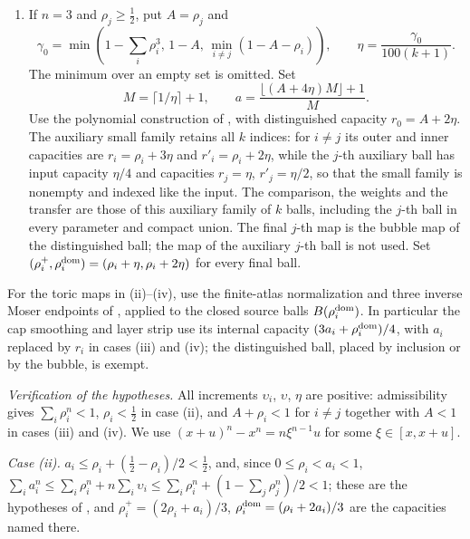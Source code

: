 \begin{construction}
\begin{enumerate}[label=(\roman*)]
\[ \]
 Use the construction of . For the distinguished ball set
 $(\rho_j^+,\rho_j^{\rm dom})=(A+\upsilon/2,A+\upsilon)$; its map is the inclusion, defined and injective on all of $\C^n$, and
 Theorem~\ref{thm:mdl-lrg} places $B((A+a)/2)=B(\rho_j^+)$ in $\Bo(a)$. For $i\ne j$, set
 $(\rho_i^+,\rho_i^{\rm dom})=((11\rho_i+5r_i)/16,(3\rho_i+5r_i)/8)$.
\item If $n=3$ and $\rho_j\ge\frac12$, put $A=\rho_j$ and
 \[
 \gamma_0=\min\left(1-\sum_i\rho_i^3,\,1-A,\,
                    \min_{i\ne j}(1-A-\rho_i)\right),\qquad
 \eta=\frac{\gamma_0}{100(k+1)}.
 \]
 The minimum over an empty set is omitted. Set
 \[
 M=\lceil1/\eta\rceil+1,\qquad
 a=\frac{\lfloor(A+4\eta)M\rfloor+1}{M}.
 \]
 Use the polynomial construction of , with distinguished capacity
 $r_0=A+2\eta$. The auxiliary small family retains all $k$ indices: for $i\ne j$ its outer and
 inner capacities are $r_i=\rho_i+3\eta$ and $r'_i=\rho_i+2\eta$, while the $j$-th auxiliary
 ball has input capacity $\eta/4$ and capacities $r_j=\eta$, $r'_j=\eta/2$, so that the small family is nonempty and
 indexed like the input. The comparison, the weights and the transfer are those of this auxiliary family of $k$ balls,
 including the $j$-th ball in every parameter and compact union. The final $j$-th map is the bubble map of the
 distinguished ball; the map of the auxiliary $j$-th ball is not used.
 Set $(\rho_i^+,\rho_i^{\rm dom})=(\rho_i+\eta,\rho_i+2\eta)$ for every final ball.
\end{enumerate}
For the toric maps in (ii)--(iv), use the finite-atlas normalization and three inverse Moser endpoints of
, applied to the closed source balls $B(\rho_i^{\rm dom})$.
In particular the cap smoothing and layer strip use its internal capacity
$(3a_i+\rho_i^{\rm dom})/4$, with $a_i$ replaced by $r_i$ in cases (iii) and (iv); the distinguished ball, placed by
inclusion or by the bubble, is exempt.
\end{construction}

\emph{Verification of the hypotheses.} All increments $\upsilon_i$, $\upsilon$, $\eta$ are positive: admissibility gives
$\sum_i\rho_i^n<1$, $\rho_i<\frac12$ in case (ii), and $A+\rho_i<1$ for $i\ne j$ together with $A<1$ in cases (iii) and (iv). We use
$(x+u)^n-x^n=n\xi^{n-1}u$ for some $\xi\in[x,x+u]$.

\emph{Case (ii).} $a_i\le\rho_i+(\frac12-\rho_i)/2<\frac12$, and, since $0\le\rho_i<a_i<1$,
$\sum_ia_i^n\le\sum_i\rho_i^n+n\sum_i\upsilon_i\le\sum_i\rho_i^n+(1-\sum_j\rho_j^n)/2<1$; these are the hypotheses of
, and $\rho_i^+=(2\rho_i+a_i)/3$, $\rho_i^{\rm dom}=(\rho_i+2a_i)/3$ are the capacities named there.

